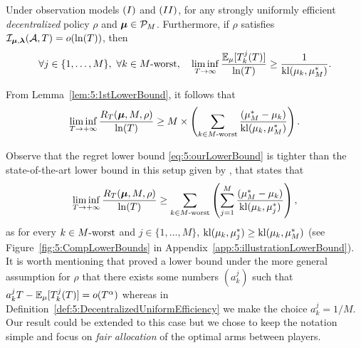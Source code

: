 \begin{theorem}\label{thm:5:BetterLowerBound}
  Under observation models $(I)$ and $(II)$, for any strongly uniformly efficient \emph{decentralized} policy $\rho$ and $\boldsymbol{\mu}\in\mathcal{P}_M$.
  Furthermore, if $\rho$ satisfies $\mathcal{I}_{\bm{\mu},\bm{\lambda}}(\mathcal{A},T) = \mathop{}\mathopen{}o\mathopen{}\left(\ln(T)\right)$, then
  \begin{equation}\label{eq:5:LBDraws}
    \forall j \in \{1,\dots,M\}, \ \forall k \in \Mworst, \ \ \ \liminf_{T\to \infty} \frac{\E_{\mu}[T_k^j(T)]}{\log(T)} \geq \frac{1}{\kl(\mu_k, \mu_M^*)}.
  \end{equation}

  \noindent From Lemma~\ref{lem:5:1stLowerBound}, it follows that
  \begin{equation}\label{eq:5:ourLowerBound}
    \mathop{\lim\inf}\limits_{T \to +\infty} \frac{R_T(\boldsymbol{\mu}, M, \rho)}{\ln(T)}
    \geq M \times \left( \sum_{k \in M\text{-}\mathrm{worst}} \frac{(\mu_M^* -  \mu_k)}{\mathrm{kl}(\mu_k, \mu_M^*)} \right) .
  \end{equation}
\end{theorem}


Observe that the regret lower bound \eqref{eq:5:ourLowerBound} is tighter than the state-of-the-art lower bound in this setup
given by \cite{Zhao10}, that states that
\begin{equation}\label{eq:5:Zhao10LowerBound}
  \mathop{\lim\inf}\limits_{T \to +\infty} \frac{R_T(\boldsymbol{\mu}, M, \rho)}{\ln(T)}
  \geq \sum_{k \in M\text{-}\mathrm{worst}} \left( \sum_{j=1}^{M} \frac{(\mu_M^* -  \mu_k)}{\mathrm{kl}(\mu_k, \mu_{j}^*)} \right),
\end{equation}
as for every $k \in M\text{-}\mathrm{worst}$ and $j \in \{1,\dots,M\}$, $\mathrm{kl}(\mu_k, \mu_j^*) \geq \mathrm{kl}(\mu_k, \mu_M^*)$
(see Figure~\ref{fig:5:CompLowerBounds} in Appendix~\ref{app:5:illustrationLowerBound}).
%
It is worth mentioning that \cite{Zhao10} proved a lower bound under the more general assumption for $\rho$ that there exists some numbers $(a_{k}^j)$ such that $a_{k}^j T - \mathbb{E}_{\mu}[T_k^j(T)] = o(T^\alpha)$ whereas in Definition~\ref{def:5:DecentralizedUniformEfficiency} we make the choice $a_{k}^j = 1/M$.
Our result could be extended to this case but we chose to keep the notation simple and focus on \emph{fair allocation} of the optimal arms between players.


